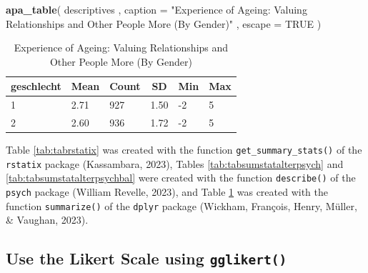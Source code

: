 \documentclass[
  doc]{apa6}
\newenvironment{Shaded}{\begin{snugshade}}{\end{snugshade}}
\newcommand{\AttributeTok}[1]{\textcolor[rgb]{0.13,0.29,0.53}{#1}}
\newcommand{\ConstantTok}[1]{\textcolor[rgb]{0.56,0.35,0.01}{#1}}
\newcommand{\FunctionTok}[1]{\textcolor[rgb]{0.13,0.29,0.53}{\textbf{#1}}}
\newcommand{\NormalTok}[1]{#1}
\newcommand{\StringTok}[1]{\textcolor[rgb]{0.31,0.60,0.02}{#1}}
\begin{document}
\begin{Shaded}
\begin{Highlighting}[]
\FunctionTok{apa\_table}\NormalTok{(}
\NormalTok{  descriptives}
\NormalTok{  , }\AttributeTok{caption =} \StringTok{"Experience of Ageing: Valuing Relationships and Other People }
\StringTok{  More (By Gender)"}
\NormalTok{  , }\AttributeTok{escape =} \ConstantTok{TRUE}
\NormalTok{)}
\end{Highlighting}
\end{Shaded}

\begin{table}[tbp]

\begin{center}
\begin{threeparttable}

\caption{\label{tab:tabdescriptives}Experience of Ageing: Valuing Relationships and Other People 
  More (By Gender)}

\begin{tabular}{llllll}
\toprule
geschlecht & \multicolumn{1}{c}{Mean} & \multicolumn{1}{c}{Count} & \multicolumn{1}{c}{SD} & \multicolumn{1}{c}{Min} & \multicolumn{1}{c}{Max}\\
\midrule
1 & 2.71 & 927 & 1.50 & -2 & 5\\
2 & 2.60 & 936 & 1.72 & -2 & 5\\
\bottomrule
\end{tabular}

\end{threeparttable}
\end{center}

\end{table}

Table \ref{tab:tabrstatix} was created with the function \texttt{get\_summary\_stats()} of the \texttt{rstatix} package (Kassambara, 2023), Tables \ref{tab:tabsumstatalterpsych} and \ref{tab:tabsumstatalterpsychbal} were created with the function \texttt{describe()} of the \texttt{psych} package (William Revelle, 2023), and Table \ref{tab:tabdescriptives} was created with the function \texttt{summarize()} of the \texttt{dplyr} package (Wickham, François, Henry, Müller, \& Vaughan, 2023).

\hypertarget{use-the-likert-scale-using-gglikert}{%
\subsection{\texorpdfstring{Use the Likert Scale using \texttt{gglikert()}}{Use the Likert Scale using gglikert()}}\label{use-the-likert-scale-using-gglikert}}
\end{document}
